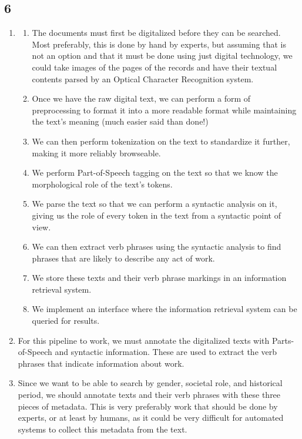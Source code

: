 \documentclass{article}
\begin{document}
\subsection{6}
\begin{enumerate}
    \item \begin{enumerate}
        \item The documents must first be digitalized before they can be searched. Most preferably, this is done by hand by experts, but assuming that is not an option and that it must be done using just digital technology, we could take images of the pages of the records and have their textual contents parsed by an Optical Character Recognition system.
        \item Once we have the raw digital text, we can perform a form of preprocessing to format it into a more readable format while maintaining the text's meaning (much easier said than done!)
        \item We can then perform tokenization on the text to standardize it further, making it more reliably browseable.
        \item We perform Part-of-Speech tagging on the text so that we know the morphological role of the text's tokens.
        \item We parse the text so that we can perform a syntactic analysis on it, giving us the role of every token in the text from a syntactic point of view.
        \item We can then extract verb phrases using the syntactic analysis to find phrases that are likely to describe any act of work.
        \item We store these texts and their verb phrase markings in an information retrieval system.
        \item We implement an interface where the information retrieval system can be queried for results.
    \end{enumerate}
    \item For this pipeline to work, we must annotate the digitalized texts with Parts-of-Speech and syntactic information. These are used to extract the verb phrases that indicate information about work.
    \item Since we want to be able to search by gender, societal role, and historical period, we should annotate texts and their verb phrases with these three pieces of metadata. This is very preferably work that should be done by experts, or at least by humans, as it could be very difficult for automated systems to collect this metadata from the text.
\end{enumerate}
\end{document}

